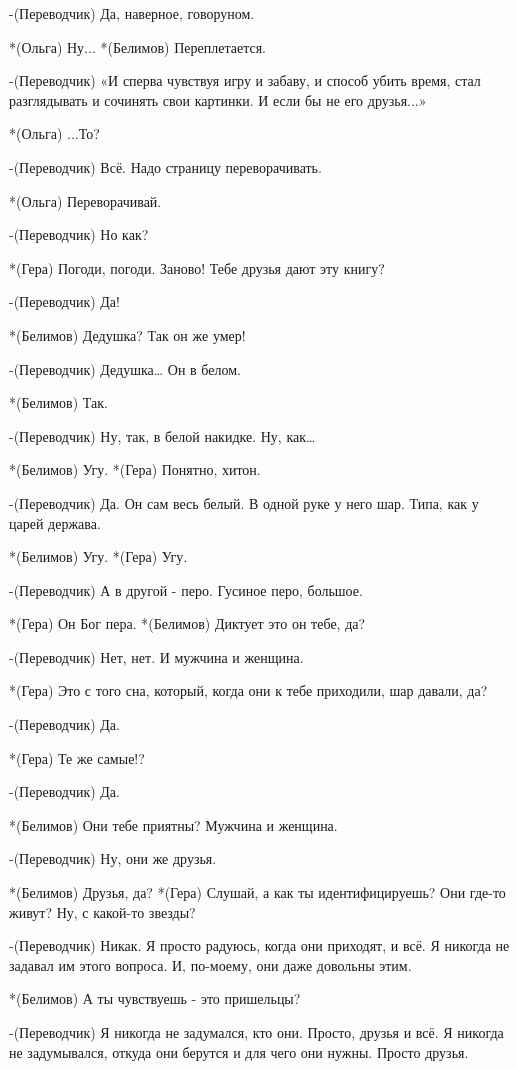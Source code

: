 -(Переводчик) Да, наверное, говоруном.

*(Ольга) Ну...
*(Белимов) Переплетается.

-(Переводчик) «И сперва чувствуя игру и забаву, и способ убить время, стал разглядывать и сочинять свои картинки. И если бы не его друзья...»

*(Ольга) ...То?

-(Переводчик) Всё. Надо страницу переворачивать. 

*(Ольга) Переворачивай.


-(Переводчик) Но как? 

*(Гера) Погоди, погоди. Заново! Тебе друзья дают эту книгу?

-(Переводчик) Да!

*(Белимов) Дедушка? Так он же умер!     

-(Переводчик) Дедушка… Он в белом.

*(Белимов) Так.

-(Переводчик) Ну, так, в белой накидке. Ну, как…

*(Белимов) Угу.
*(Гера) Понятно, хитон.

-(Переводчик) Да. Он сам весь белый. В одной руке у него шар. Типа, как у царей держава.

*(Белимов) Угу.
*(Гера) Угу.

-(Переводчик) А в другой - перо. Гусиное перо, большое.

*(Гера) Он Бог пера.
*(Белимов) Диктует это он тебе, да?

-(Переводчик) Нет, нет. И мужчина и женщина.

*(Гера) Это с того сна, который, когда они к тебе приходили, шар давали, да?

-(Переводчик) Да.

*(Гера) Те же самые!?

-(Переводчик) Да.

*(Белимов) Они тебе приятны? Мужчина и женщина.

-(Переводчик) Ну, они же друзья.

*(Белимов) Друзья, да?
*(Гера) Слушай, а как ты идентифицируешь? Они где-то живут? Ну, с какой-то звезды?

-(Переводчик) Никак. Я просто радуюсь, когда  они приходят, и всё. Я никогда не задавал им этого вопроса. И, по-моему, они даже довольны этим.

*(Белимов) А ты чувствуешь - это пришельцы?

-(Переводчик) Я никогда не задумался, кто они. Просто, друзья и всё. Я никогда не задумывался, откуда они берутся и для чего они нужны. Просто друзья.

